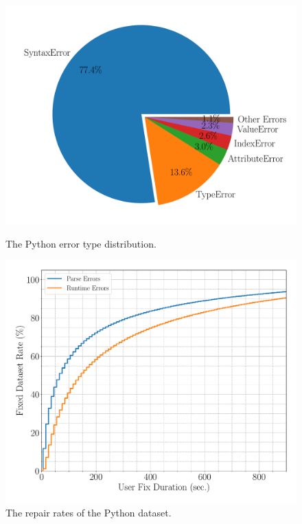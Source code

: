 \begin{figure}[t]
  \centering
  \begin{minipage}[c]{0.51\linewidth}
    \centering
    \includegraphics[width=\linewidth]{error-pie.pdf}
    \caption{The Python error type distribution.}
    \label{fig:error-statistics}
  \end{minipage}
  \begin{minipage}[c]{0.48\linewidth}
      \centering
      \includegraphics[width=\linewidth]{fixed-rate.pdf}
      \caption{The repair rates of the Python dataset.}
      \label{fig:repair-rate}
  \end{minipage}
\end{figure}


